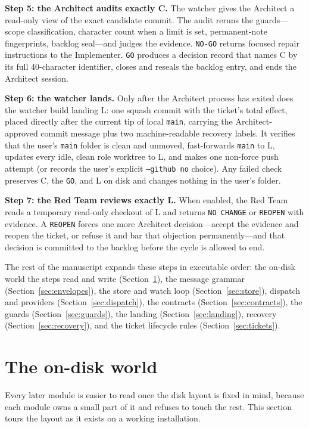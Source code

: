 \documentclass[10pt,aps,prd,twocolumn,nofootinbib]{revtex4-2}
\newcommand{\code}[1]{\texttt{#1}}
\begin{document}
\textbf{Step 5: the Architect audits exactly C.}  The watcher gives the
Architect a read-only view of the exact candidate commit.  The audit
reruns the guards---scope classification, character count when a limit
is set, permanent-note fingerprints, backlog seal---and judges the
evidence.  \code{NO-GO} returns focused repair instructions to the
Implementer.  \code{GO} produces a decision record that names C by its
full 40-character identifier, closes and reseals the backlog entry, and
ends the Architect session.

\textbf{Step 6: the watcher lands.}  Only after the Architect process
has exited does the watcher build landing L: one squash commit with the
ticket's total effect, placed directly after the current tip of local
\code{main}, carrying the Architect-approved commit message plus two
machine-readable recovery labels.  It verifies that the user's
\code{main} folder is clean and unmoved, fast-forwards \code{main} to
L, updates every idle, clean role worktree to L, and makes one
non-force push attempt (or records the user's explicit \code{--github
no} choice).  Any failed check preserves C, the \code{GO}, and L on
disk and changes nothing in the user's folder.

\textbf{Step 7: the Red Team reviews exactly L.}  When enabled, the Red
Team reads a temporary read-only checkout of L and returns \code{NO
CHANGE} or \code{REOPEN} with evidence.  A \code{REOPEN} forces one
more Architect decision---accept the evidence and reopen the ticket, or
refuse it and bar that objection permanently---and that decision is
committed to the backlog before the cycle is allowed to end.

The rest of the manuscript expands these steps in executable order:
the on-disk world the steps read and write
(Section~\ref{sec:disk-world}), the message grammar
(Section~\ref{sec:envelopes}), the store and watch loop
(Section~\ref{sec:store}), dispatch and providers
(Section~\ref{sec:dispatch}), the contracts
(Section~\ref{sec:contracts}), the guards
(Section~\ref{sec:guards}), the landing
(Section~\ref{sec:landing}), recovery
(Section~\ref{sec:recovery}), and the ticket lifecycle rules
(Section~\ref{sec:tickets}).

\section{The on-disk world}
\label{sec:disk-world}

Every later module is easier to read once the disk layout is fixed in
mind, because each module owns a small part of it and refuses to touch
the rest.  This section tours the layout as it exists on a working
installation.
\end{document}
